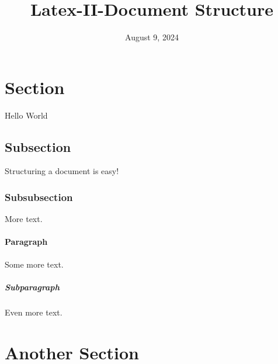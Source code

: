 \documentclass{article}
\title{Latex-II-Document Structure}
\begin{document}
\date{August 9, 2024}
\maketitle
\section{Section}
Hello World
\subsection{Subsection}
Structuring a document is easy!
\subsubsection{Subsubsection}
More text.
\paragraph{Paragraph}
Some more text.
\subparagraph{Subparagraph}
Even more text.
\section{Another Section}
\end{document}
